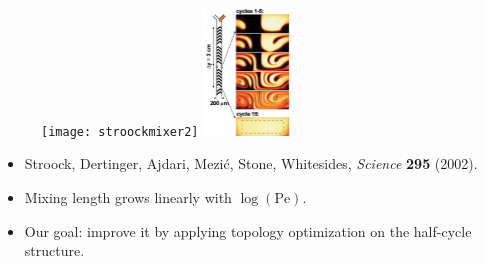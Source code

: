 \documentclass[12pt,t]{beamer}
\begin{document}
\begin{frame}
  \begin{figure}
    \centerline{
     \texttt{[image: stroockmixer2]}
     \includegraphics[width=0.21\textwidth]{stroockcrosssection}
    }
  \end{figure}
  \vspace{-0.3cm}
  \begin{itemize}
    \item Stroock, Dertinger, Ajdari, Mezi\'c, Stone, Whitesides, \textit{Science} \textbf{295} (2002).
    \item Mixing length grows linearly with $\log(\text{Pe})$.
    \item Our goal: improve it by applying topology optimization on the half-cycle structure.
  \end{itemize}
\end{frame}
\end{document}
